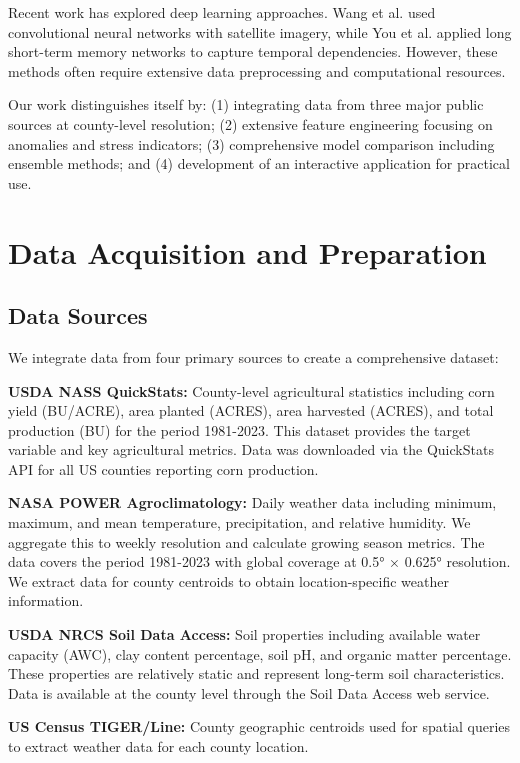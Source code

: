 \documentclass[conference]{IEEEtran}
\begin{document}
Recent work has explored deep learning approaches. Wang et al. \cite{wang2018deep} used convolutional neural networks with satellite imagery, while You et al. \cite{you2017deep} applied long short-term memory networks to capture temporal dependencies. However, these methods often require extensive data preprocessing and computational resources.

Our work distinguishes itself by: (1) integrating data from three major public sources at county-level resolution; (2) extensive feature engineering focusing on anomalies and stress indicators; (3) comprehensive model comparison including ensemble methods; and (4) development of an interactive application for practical use.

\section{Data Acquisition and Preparation}

\subsection{Data Sources}

We integrate data from four primary sources to create a comprehensive dataset:

\textbf{USDA NASS QuickStats:} County-level agricultural statistics including corn yield (BU/ACRE), area planted (ACRES), area harvested (ACRES), and total production (BU) for the period 1981-2023. This dataset provides the target variable and key agricultural metrics. Data was downloaded via the QuickStats API for all US counties reporting corn production.

\textbf{NASA POWER Agroclimatology:} Daily weather data including minimum, maximum, and mean temperature, precipitation, and relative humidity. We aggregate this to weekly resolution and calculate growing season metrics. The data covers the period 1981-2023 with global coverage at 0.5° × 0.625° resolution. We extract data for county centroids to obtain location-specific weather information.

\textbf{USDA NRCS Soil Data Access:} Soil properties including available water capacity (AWC), clay content percentage, soil pH, and organic matter percentage. These properties are relatively static and represent long-term soil characteristics. Data is available at the county level through the Soil Data Access web service.

\textbf{US Census TIGER/Line:} County geographic centroids used for spatial queries to extract weather data for each county location.
\end{document}
